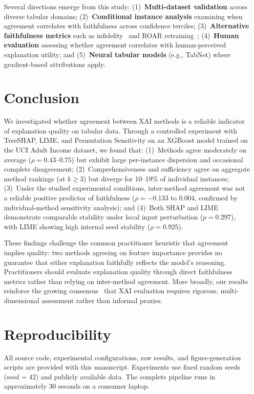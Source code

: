 \documentclass[conference, 10pt]{IEEEtran}
\begin{document}
Several directions emerge from this study: (1)~\textbf{Multi-dataset validation} across diverse tabular domains; (2)~\textbf{Conditional instance analysis} examining when agreement correlates with faithfulness across confidence terciles; (3)~\textbf{Alternative faithfulness metrics} such as infidelity~\cite{yeh2019infidelity} and ROAR retraining~\cite{hooker2019benchmark}; (4)~\textbf{Human evaluation} assessing whether agreement correlates with human-perceived explanation utility; and (5)~\textbf{Neural tabular models} (e.g., TabNet) where gradient-based attributions apply.

\section{Conclusion}
\label{sec:conclusion}

We investigated whether agreement between XAI methods is a reliable indicator of explanation quality on tabular data. Through a controlled experiment with TreeSHAP, LIME, and Permutation Sensitivity on an XGBoost model trained on the UCI Adult Income dataset, we found that:
(1)~Methods agree moderately on average ($\rho = 0.43$--$0.75$) but exhibit large per-instance dispersion and occasional complete disagreement;
(2)~Comprehensiveness and sufficiency agree on aggregate method rankings (at $k \ge 3$) but diverge for 10--19\% of individual instances;
(3)~Under the studied experimental conditions, inter-method agreement was not a reliable positive predictor of faithfulness ($\rho = -0.133$ to $0.004$, confirmed by individual-method sensitivity analysis); and
(4)~Both SHAP and LIME demonstrate comparable stability under local input perturbation ($p = 0.297$), with LIME showing high internal seed stability ($\rho = 0.925$).

These findings challenge the common practitioner heuristic that agreement implies quality: two methods agreeing on feature importance provides no guarantee that either explanation faithfully reflects the model's reasoning. Practitioners should evaluate explanation quality through direct faithfulness metrics rather than relying on inter-method agreement. More broadly, our results reinforce the growing consensus~\cite{hedstrom2024latec, krishna2022disagreement} that XAI evaluation requires rigorous, multi-dimensional assessment rather than informal proxies.

\balance
\section*{Reproducibility}

All source code, experimental configurations, raw results, and figure-generation scripts are provided with this manuscript. Experiments use fixed random seeds (seed = 42) and publicly available data. The complete pipeline runs in approximately 30 seconds on a consumer laptop.



\end{document}
